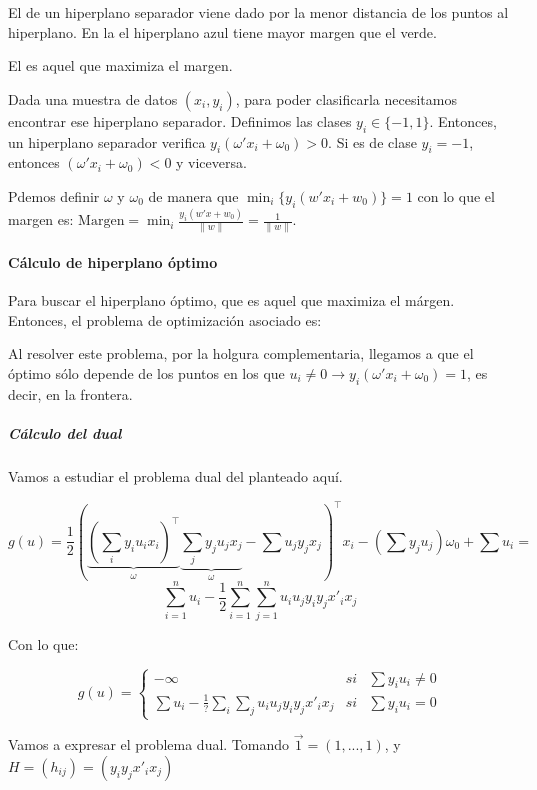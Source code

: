 El  de un hiperplano separador viene dado por la menor distancia de los puntos al hiperplano. 
%
En la  el hiperplano azul tiene mayor margen que el verde.

El  es aquel que maximiza el margen.


Dada una muestra de datos $(x_i,y_i)$, para poder clasificarla necesitamos encontrar ese hiperplano separador.
%
Definimos las clases $y_i\in\{-1,1\}$. Entonces, un hiperplano separador verifica $y_i(ω'x_i+ω_0)>0$.
%
Si es de clase $y_i=-1$, entonces $(ω'x_i + ω_0) < 0$ y viceversa.

Pdemos definir $ω$ y $ω_0$ de manera que  $\min_i \{y_i(w' x_i + w_0)\}=1$
con lo que el margen es: $\mbox{Margen} = \min_i  \frac{y_i(w' x + w_0)}{\|w\|} = \frac{1}{\|w\|}$.


\paragraph{Cálculo de hiperplano óptimo}


Para buscar el hiperplano óptimo, que es aquel que maximiza el márgen. Entonces, el problema de optimización asociado es:

\begin{ioprob}
\end{ioprob}


Al resolver este problema, por la holgura complementaria, llegamos  a que el óptimo sólo depende de los puntos en los que $u_i≠0 \to y_i(ω'x_i + ω_0) = 1$, es decir, en la frontera.

\subparagraph{Cálculo del dual}
Vamos a estudiar el problema dual del planteado aquí.

\[
	g(u) = \frac{1}{2}\left(\underbrace{\left(\sum_i y_iu_ix_i\right)^\top}_{ω} \underbrace{\sum_jy_ju_jx_j}_{ω} - \sum u_jy_jx_j\right)^\top x_i - \left(\sum y_ju_j\right)ω_0 + \sum u_i = 
\]
\[ 
	\sum_{i=1}^n u_i - \frac{1}{2} \sum_{i=1}^n \sum_{j=1}^n  u_i u_j y_i y_j x'_i x_j 
\]

Con lo que:

\[
	g(u) =\left\{\begin{array}{ccc} -∞ & si &\sum y_iu_i ≠ 0\\ \sum u_i - \frac{1}{?}\sum_i\sum_j u_i u_j y_i y_j x'_i x_j  & si & \sum y_iu_i = 0
	\end{array}\right.
\]

Vamos a expresar el problema dual.
%
Tomando $\vec{1} = (1,...,1)$, y $H = (h_{ij}) = (y_iy_jx'_ix_j)$

